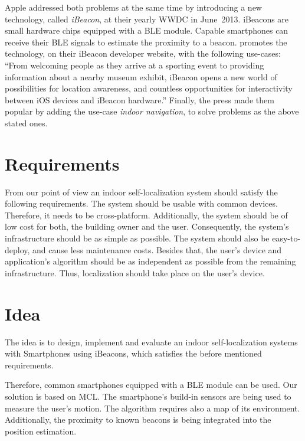 Apple addressed both problems at the same time by introducing a new technology, called \emph{iBeacon}, at their yearly \ac{WWDC} in June~2013. iBeacons are small hardware chips equipped with a \ac{BLE} module. Capable smartphones can receive their \acs{BLE} signals to estimate the proximity to a beacon. \citet{apple:ibeacon_site} promotes the technology, on their iBeacon developer website, with the following use-cases: ``From welcoming people as they arrive at a sporting event to providing information about a nearby museum exhibit, iBeacon opens a new world of possibilities for location awareness, and countless opportunities for interactivity between iOS devices and iBeacon hardware.'' Finally, the press made them popular by adding the use-case \emph{indoor navigation}, to solve problems as the above stated ones.

\section{Requirements}
From our point of view an indoor self-localization system should satisfy the following requirements. The system should be usable with common devices. Therefore, it needs to be cross-platform. Additionally, the system should be of low cost for both, the building owner and the user. Consequently, the system's infrastructure should be as simple as possible. The system should also be easy-to-deploy, and cause less maintenance costs. Besides that, the user's device and application's algorithm should be as independent as possible from the remaining infrastructure. Thus, localization should take place on the user's device.

\section{Idea}
The idea is to design, implement and evaluate an indoor self-localization systems with Smartphones using iBeacons, which satisfies the before mentioned requirements.

Therefore, common smartphones equipped with a \acs{BLE} module can be used. Our solution is based on \ac{MCL}. The smartphone's build-in sensors are being used to measure the user's motion. The algorithm requires also a map of its environment. Additionally, the proximity to known beacons is being integrated into the position estimation.

